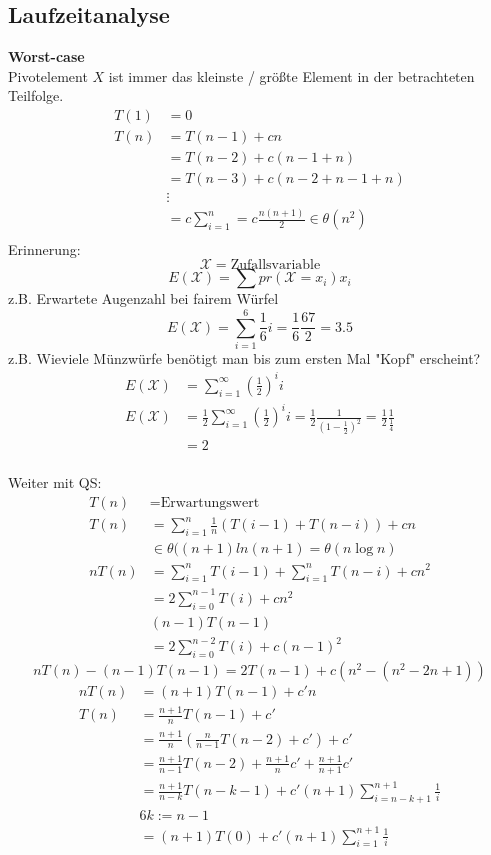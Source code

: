 \documentclass[a4paper,twoside,10pt]{report}
\begin{document}
{\subsection{Laufzeitanalyse}
\textbf{Worst-case}\\
Pivotelement $X$ ist immer das kleinste / größte Element in der betrachteten Teilfolge.
\begin{align*}
T(1)&=0\\
T(n)&=T(n-1)+cn\\
&=T(n-2)+c(n-1+n)\\
&=T(n-3)+c(n-2+n-1+n)\\
&\vdots\\
&=c\sum_{i=1}^n=c\frac{n(n+1)}{2}\in \theta(n^2)\\
\end{align*}
Erinnerung:\\
$$\mathcal X =\mbox{Zufallsvariable}$$
$$E(\mathcal X)=\sum pr(\mathcal X= x_i)x_i$$
z.B. Erwartete Augenzahl bei fairem Würfel
$$E(\mathcal X)=\sum_{i=1}^6\frac{1}{6}i=\frac{1}{6}\frac{67}{2}=3.5$$
z.B. Wieviele Münzwürfe benötigt man bis zum ersten Mal "Kopf" erscheint?
\begin{align*}
E(\mathcal X)&=\sum_{i=1}^\infty \left(\frac{1}{2}\right)^ii\\
E(\mathcal X)&=\frac{1}{2}\sum_{i=1}^\infty\left(\frac{1}{2}\right)^ii=\frac{1}{2}\frac{1}{(1-\frac{1}{2})^2}=\frac{1}{2}\frac{1}{\frac{1}{4}}\\&=2
\end{align*}
\\[.5em]
Weiter mit QS:\\
\begin{align*}
T(n) &= \mbox{Erwartungswert}\\
T(n)&=\sum_{i=1}^n\frac{1}{n}\left(T(i-1)+T(n-i)\right)+cn\\
&\in \theta((n+1)ln(n+1)=\theta(n\log n)\\
nT(n)&=\sum_{i=1}^nT(i-1)+\sum_{i=1}^nT(n-i) +cn^2\\
&=2\sum_{i=0}^{n-1}T(i)+cn^2\\
&(n-1)T(n-1)\\
&=2\sum_{i=0}^{n-2}T(i)+c(n-1)^2\end{align*}
\tiny\[nT(n)-(n-1)T(n-1)=2T(n-1)+c(n^2-(n^2-2n+1))\]
\small\begin{align*}
nT(n)&=(n+1)T(n-1)+c'n\\
T(n)&=\frac{n+1}{n}T(n-1)+c'\\
&=\frac{n+1}{n}\left(\frac{n}{n-1}T(n-2)+c'\right)+c'\\
&=\frac{n+1}{n-1}T(n-2)+\frac{n+1}{n}c'+\frac{n+1}{n+1}c'\\
&=\frac{n+1}{n-k}T(n-k-1)+c'(n+1)\sum_{i=n-k+1}^{n+1}\frac{1}{i}\\
&6k:=n-1\\
&=(n+1)T(0)+c'(n+1)\sum_{i=1}^{n+1}\frac{1}{i}
\end{align*}
\normalsize
}
\end{document}
